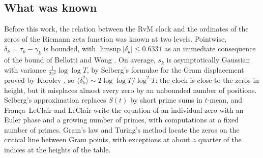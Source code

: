 \documentclass[preprint,12pt]{elsarticle}
\numberwithin{equation}{section}
\theoremstyle{plain}
\theoremstyle{definition}
\theoremstyle{remark}
\begin{document}
\subsection{What was known}
Before this work, the relation between the RvM clock and the ordinates of the zeros of the Riemann zeta function was known at two levels. Pointwise, $\delta_k=\tau_k-\gamma_k$ is bounded, with $\limsup|\delta_k|\le0.6331$ as an immediate consequence of the bound of Bellotti and Wong \cite{BellottiWong2025}. On average, $s_k$ is asymptotically Gaussian with variance $\frac1{2\pi^2}\log\log T$, by Selberg's formulae for the Gram displacement proved by Korolev \cite{Korolev2012,Korolev2011}, so $\langle\delta_k^2\rangle\sim2\log\log T/\log^2T$: the clock is close to the zeros in height, but it misplaces almost every zero by an unbounded number of positions. Selberg's approximation \cite{Selberg1946a,Fujii1974} replaces $S(t)$ by short prime sums in $t$-mean, and Fran\c{c}a--LeClair and LeClair \cite{FrancaLeClair2015,LeClair2021,FrancaLeClair2024} write the equation of an individual zero with an Euler phase and a growing number of primes, with computations at a fixed number of primes. Gram's law \cite{Gram1903} and Turing's method \cite{Turing1953} locate the zeros on the critical line between Gram points, with exceptions at about a quarter of the indices at the heights of the table.
\end{document}
